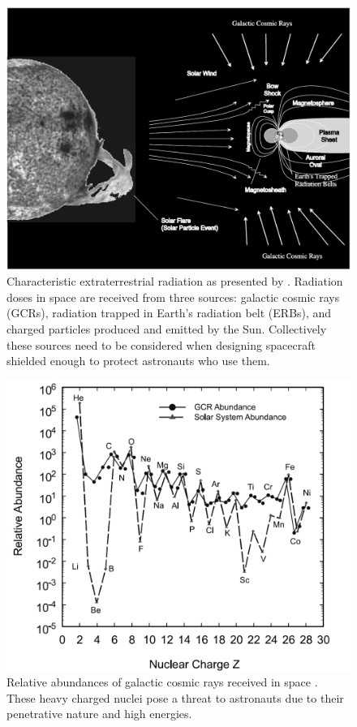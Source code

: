 \begin{figure}
\centering
\includegraphics[width=\linewidth]{space_radiation.png}
\caption{Characteristic extraterrestrial radiation as presented by \cite{bentonbenton}. Radiation doses in space are received from three sources: galactic cosmic rays (GCRs), radiation trapped in Earth’s radiation belt (ERBs), and charged particles produced and emitted by the Sun. Collectively these sources need to be considered when designing spacecraft shielded enough to protect astronauts who use them.}
\label{fig:space-radiation }
\end{figure}

\begin{figure}
\centering
\includegraphics[width=\linewidth]{abundances}
\caption{Relative abundances of galactic cosmic rays received in space \cite{bentonbenton}. These heavy charged nuclei pose a threat to astronauts due to their penetrative nature and high energies.}
\label{fig:abundances }
\end{figure}

